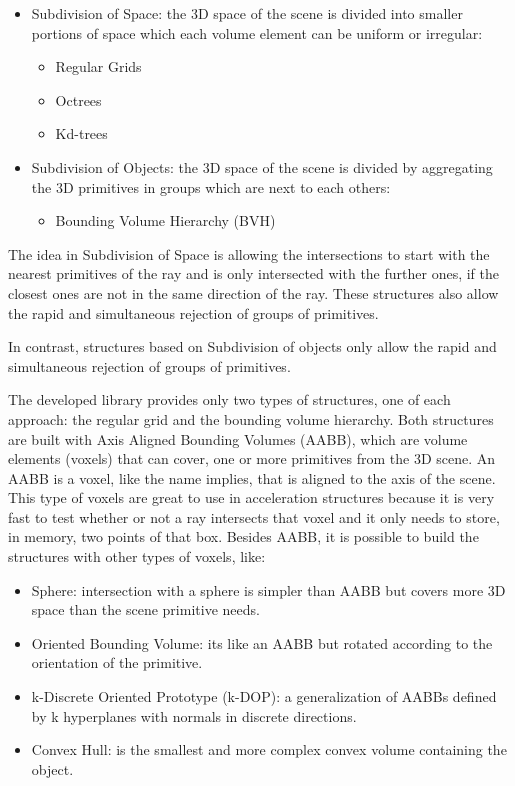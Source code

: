 \begin{itemize}
	\item Subdivision of Space: the 3D space of the scene is divided into smaller portions of space which each volume element can be uniform or irregular:
	\begin{itemize}
		\item Regular Grids
		\item Octrees
		\item Kd-trees
	\end{itemize}
	\item Subdivision of Objects: the 3D space of the scene is divided by aggregating the 3D primitives in groups which are next to each others:
	\begin{itemize}
		\item Bounding Volume Hierarchy (BVH)
	\end{itemize}
\end{itemize}

\par
The idea in Subdivision of Space is allowing the intersections to start with the nearest primitives of the ray and is only intersected with the further ones, if the closest ones are not in the same direction of the ray.
These structures also allow the rapid and simultaneous rejection of groups of primitives.

\par
In contrast, structures based on Subdivision of objects only allow the rapid and simultaneous rejection of groups of primitives.

\par
The developed library provides only two types of structures, one of each approach: the regular grid and the bounding volume hierarchy.
Both structures are built with Axis Aligned Bounding Volumes (AABB), which are volume elements (voxels) that can cover, one or more primitives from the 3D scene.
An AABB is a voxel, like the name implies, that is aligned to the axis of the scene.
This type of voxels are great to use in acceleration structures because it is very fast to test whether or not a ray intersects that voxel and it only needs to store, in memory, two points of that box.
Besides AABB, it is possible to build the structures with other types of voxels, like:

\begin{itemize}
	\item Sphere: intersection with a sphere is simpler than AABB but covers more 3D space than the scene primitive needs.
	\item Oriented Bounding Volume: its like an AABB but rotated according to the orientation of the primitive.
	\item k-Discrete Oriented Prototype (k-DOP): a generalization of AABBs defined by k hyperplanes with normals in discrete directions.
	\item Convex Hull: is the smallest and more complex convex volume containing the object.
\end{itemize}

